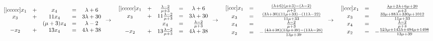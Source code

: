\documentclass{article}
\begin{document}
    \begin{math}
        \begin{matrix}[|ccccc]
            x_1 & + & x_4 & = & \lambda + 6\\
            x_3 & + & 11x_4 & = & 3\lambda + 30\\
            ~ & ~ & (\mu + 3)x_4 & = & \lambda - 2\\
            -x_2 & + & 13x_4 & = & 4\lambda + 38
        \end{matrix}\\
        \\
        \\
        \to\quad
        \begin{matrix}[|ccccc]
            x_1 & + & \frac{\lambda - 2}{\mu + 3} & = & \lambda + 6\\
            x_3 & + & 11\frac{\lambda - 2}{\mu + 3} & = & 3\lambda + 30\\
            ~ & ~ & x_4 & = & \frac{\lambda - 2}{\mu + 3}\\
            -x_2 & + & 13\frac{\lambda - 2}{\mu + 3} & = & 4\lambda + 38
        \end{matrix}\\
        \\
        \\
        \to\quad
        \begin{matrix}[|ccc]
            x_1 & = & \frac{(\lambda + 6)(\mu + 3) - (\lambda - 2)}{\mu + 3}\\
            x_3 & = & \frac{(3\lambda + 30)(11\mu + 33) - (11\lambda - 22)}{11\mu + 33}\\
            x_4 & = & \frac{\lambda - 2}{\mu + 3}\\
            x_2 & = & -\frac{(4\lambda + 38)(13\mu + 39) - (13\lambda - 26)}{13\mu + 39}
        \end{matrix}\\
        \\
        \\
        \to\quad
        \begin{matrix}[|ccc]
            x_1 & = & \frac{\lambda\mu + 2\lambda + 6\mu + 20}{\mu + 3}\\
            x_3 & = & \frac{33\mu + 88\lambda + 330\mu + 1012}{11\mu + 33}\\
            x_4 & = & \frac{\lambda - 2}{\mu + 3}\\
            x_2 & = & -\frac{52\lambda\mu + 143\lambda + 494\mu + 1498}{13\mu + 39}
        \end{matrix}
    \end{math}\\
\end{document}
